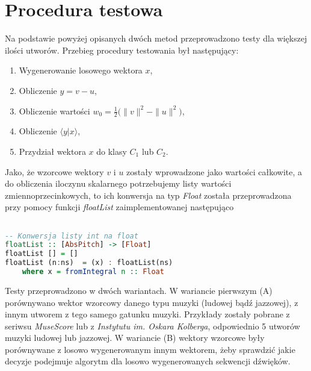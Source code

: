 \section{Procedura testowa}
Na podstawie powyżej opisanych dwóch metod przeprowadzono testy dla większej ilości utworów. Przebieg procedury testowania był następujący:
\begin{enumerate}
    \item Wygenerowanie losowego wektora $x$,
    \item Obliczenie $y = v - u$,
    \item Obliczenie wartości $w_{0} =\frac{1}{2} \big(\|v\|^{2} - \|u\|^{2}\big)$,
    \item Obliczenie $\big \langle y|x \big \rangle$,
    \item Przydział wektora $x$ do klasy $C_{1}$ lub $C_{2}$.
\end{enumerate}

Jako, że wzorcowe wektory $v$ i $u$ zostały wprowadzone jako wartości całkowite, a do obliczenia iloczynu skalarnego potrzebujemy listy wartości zmiennoprzecinkowych, to ich konwersja na typ \textit{Float} została przeprowadzona przy pomocy funkcji \textit{floatList} zaimplementowanej następująco

\begin{lstlisting}[language = Haskell]

-- Konwersja listy int na float
floatList :: [AbsPitch] -> [Float]
floatList [] = []
floatList (n:ns)  = (x) : floatList(ns)
    where x = fromIntegral n :: Float 
\end{lstlisting}

Testy przeprowadzono w dwóch wariantach. W wariancie pierwszym (A) porównywano wektor wzorcowy danego typu muzyki (ludowej bądź jazzowej), z innym utworem z tego samego gatunku muzyki. Przykłady zostały pobrane z seriwsu \textit{MuseScore} lub z \textit{Instytutu im. Oskara Kolberga}, odpowiednio 5 utworów muzyki ludowej lub jazzowej. W wariancie (B) wektory wzorcowe były porównywane z losowo wygenerowanym innym wektorem, żeby sprawdzić jakie decyzje podejmuje algorytm dla losowo wygenerowanych sekwencji dźwięków. 

